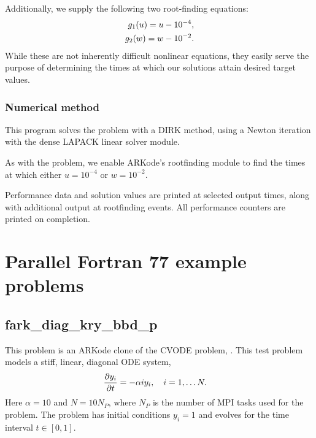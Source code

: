 \documentclass[letterpaper,10pt,english]{sphinxmanual}
\begin{document}
Additionally, we supply the following two root-finding equations:
\begin{gather}
\begin{split}g_1(u) = u - 10^{-4}, \\
g_2(w) = w - 10^{-2}.\end{split}\notag
\end{gather}
While these are not inherently difficult nonlinear equations, they
easily serve the purpose of determining the times at which our
solutions attain desired target values.


\subsection{Numerical method}
\label{f77_serial:id3}
This program solves the problem with a DIRK method, using a Newton
iteration with the dense LAPACK linear solver module.

As with the {\hyperref[c_serial:ark-robertson-root]{\emph{}}} problem, we enable ARKode's
rootfinding module to find the times at which
either \(u=10^{-4}\) or \(w=10^{-2}\).

Performance data and solution values are printed at
selected output times, along with additional output at rootfinding
events.  All performance counters are printed on completion.


\chapter{Parallel Fortran 77 example problems}
\label{f77_parallel::doc}\label{f77_parallel:parallel-f77}\label{f77_parallel:parallel-fortran-77-example-problems}

\section{fark\_diag\_kry\_bbd\_p}
\label{f77_parallel:fark-diag-kry-bbd-p}\label{f77_parallel:id1}
This problem is an ARKode clone of the CVODE problem,
.  This test problem models a stiff, linear,
diagonal ODE system,
\begin{gather}
\begin{split}\frac{\partial y_i}{\partial t} &= -\alpha i y_i, \quad i=1,\ldots N.\end{split}\notag
\end{gather}
Here \(\alpha=10\) and \(N=10 N_P\), where \(N_P\) is the
number of MPI tasks used for the problem.  The problem has initial
conditions \(y_i=1\) and evolves for the time interval \(t\in [0,1]\).
\end{document}
